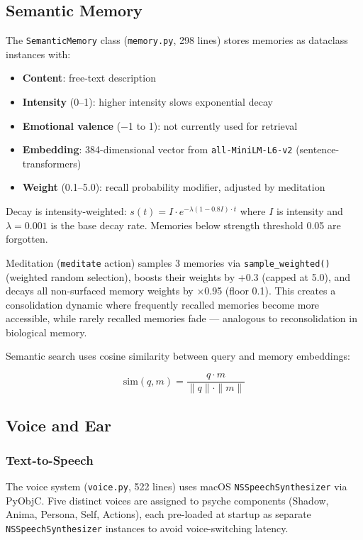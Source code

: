 \documentclass[11pt,oneside]{article}
\begin{document}
\subsection{Semantic Memory}

The \texttt{SemanticMemory} class (\texttt{memory.py}, 298 lines) stores memories as dataclass instances with:

\begin{itemize}
  \item \textbf{Content}: free-text description
  \item \textbf{Intensity} (0--1): higher intensity slows exponential decay
  \item \textbf{Emotional valence} ($-$1 to 1): not currently used for retrieval
  \item \textbf{Embedding}: 384-dimensional vector from \texttt{all-MiniLM-L6-v2} (sentence-transformers)
  \item \textbf{Weight} (0.1--5.0): recall probability modifier, adjusted by meditation
\end{itemize}

Decay is intensity-weighted: $s(t) = I \cdot e^{-\lambda(1 - 0.8I) \cdot t}$ where $I$ is intensity and $\lambda = 0.001$ is the base decay rate.
Memories below strength threshold 0.05 are forgotten.

Meditation (\texttt{meditate} action) samples 3 memories via \texttt{sample\_weighted()} (weighted random selection), boosts their weights by +0.3 (capped at 5.0), and decays all non-surfaced memory weights by $\times$0.95 (floor 0.1).
This creates a consolidation dynamic where frequently recalled memories become more accessible, while rarely recalled memories fade --- analogous to reconsolidation in biological memory.

Semantic search uses cosine similarity between query and memory embeddings:

\[
\text{sim}(q, m) = \frac{q \cdot m}{\|q\| \cdot \|m\|}
\]

\subsection{Voice and Ear}

\subsubsection{Text-to-Speech}

The voice system (\texttt{voice.py}, 522 lines) uses macOS \texttt{NSSpeechSynthesizer} via PyObjC.
Five distinct voices are assigned to psyche components (Shadow, Anima, Persona, Self, Actions), each pre-loaded at startup as separate \texttt{NSSpeechSynthesizer} instances to avoid voice-switching latency.
\end{document}
